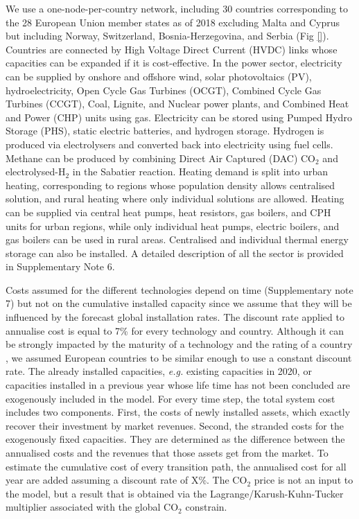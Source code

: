 \documentclass[5p]{elsarticle} %
\begin{document}
We use a one-node-per-country network, including 30 countries corresponding to the 28 European Union member states as of 2018 excluding Malta and Cyprus but including Norway, Switzerland, Bosnia-Herzegovina, and Serbia (Fig \ref{}). Countries are connected by High Voltage Direct Current (HVDC) links whose capacities can be expanded if it is cost-effective. In the power sector, electricity can be supplied by onshore and offshore wind, solar photovoltaics (PV), hydroelectricity, Open Cycle Gas Turbines (OCGT), Combined Cycle Gas Turbines (CCGT), Coal, Lignite, and Nuclear power plants, and Combined Heat and Power (CHP) units using gas. Electricity can be stored using Pumped Hydro Storage (PHS), static electric batteries, and hydrogen storage. Hydrogen is produced via electrolysers and converted back into electricity using fuel cells. Methane can be produced by combining Direct Air Captured (DAC) CO$_2$ and electrolysed-H$_2$ in the Sabatier reaction.  
Heating demand is split into urban heating, corresponding to regions whose population density allows centralised solution, and rural heating where only individual solutions are allowed. Heating can be supplied via central heat pumps, heat resistors, gas boilers, and CPH units for urban regions, while only individual heat pumps, electric boilers, and gas boilers can be used in rural areas. Centralised and individual thermal energy storage can also be installed. A detailed description of all the sector is provided in Supplementary Note 6. \

Costs assumed for the different technologies depend on time (Supplementary note 7) but not on the cumulative installed capacity since we assume that they will be influenced by the forecast global installation rates. The discount rate applied to annualise cost is equal to 7\% for every technology and country. Although it can be strongly impacted by the maturity of a technology and the rating of a country \cite{Egli_2019}, we assumed European countries to be similar enough to use a constant discount rate.  The already installed capacities, \textit{e.g.} existing capacities in 2020, or capacities installed in a previous year whose life time has not been concluded are exogenously included in the model. For every time step, the total system cost includes two components. First, the costs of newly installed assets, which exactly recover their investment by market revenues. Second, the stranded costs for the exogenously fixed capacities. They are determined as the difference between the annualised costs and the revenues that those assets get from the market.  To estimate the cumulative cost of every transition path, the annualised cost for all year are added assuming a discount rate of X\%. %
The CO$_2$ price is not an input to the model, but a result that is obtained via the Lagrange/Karush-Kuhn-Tucker multiplier associated with the global CO$_2$ constrain. 
\end{document}
